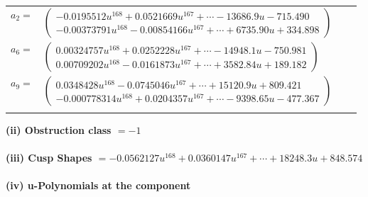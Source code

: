 \documentclass[1p]{elsarticle_modified}
\theoremstyle{definition}
\begin{document}
\begin{tabular}{m{7pt} m{180pt} m{7pt} m{180pt} }
\flushright $a_{2}=$&$\begin{pmatrix}-0.0195512 u^{168}+0.0521669 u^{167}+\cdots-13686.9 u-715.490\\-0.00373791 u^{168}-0.00854166 u^{167}+\cdots+6735.90 u+334.898\end{pmatrix}$ \\
\flushright $a_{6}=$&$\begin{pmatrix}0.00324757 u^{168}+0.0252228 u^{167}+\cdots-14948.1 u-750.981\\0.00709202 u^{168}-0.0161873 u^{167}+\cdots+3582.84 u+189.182\end{pmatrix}$ \\
\flushright $a_{9}=$&$\begin{pmatrix}0.0348428 u^{168}-0.0745046 u^{167}+\cdots+15120.9 u+809.421\\-0.000778314 u^{168}+0.0204357 u^{167}+\cdots-9398.65 u-477.367\end{pmatrix}$\\&\end{tabular}
\flushleft \textbf{(ii) Obstruction class $= -1$}\\~\\
\flushleft \textbf{(iii) Cusp Shapes $= -0.0562127 u^{168}+0.0360147 u^{167}+\cdots+18248.3 u+848.574$}\\~\\
\newpage\renewcommand{\arraystretch}{1}
\flushleft \textbf{(iv) u-Polynomials at the component}\newline \\
\end{document}
